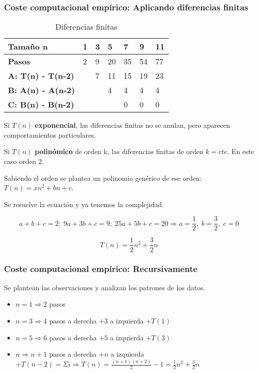 \subsubsection{Coste computacional empírico: Aplicando diferencias finitas}
\begin{table}[H]
    \begin{tabular}{|l|l|l|l|l|l|l|}
    \hline
    Tamaño n                  & \textbf{1} & \textbf{3} & \textbf{5} & \textbf{7} & \textbf{9} & \textbf{11} \\ \hline
    \textbf{Pasos}            & 2          & 9          & 20         & 35         & 54         & 77          \\ \hline
    \textbf{A: T(n) - T(n-2)} &            & 7          & 11         & 15         & 19         & 23          \\ \hline
    \textbf{B: A(n) - A(n-2)} &            &            & 4          & 4          & 4          & 4           \\ \hline
    \textbf{C: B(n) - B(n-2)} &            &            &            & 0          & 0          & 0           \\ \hline
    \end{tabular}
    \caption{Diferencias finitas}
\end{table}

Si $T(n)$ \textbf{exponencial}, las diferencias finitas no se anulan, pero aparecen comportamientos particulares.

Si $T(n)$ \textbf{polinómico} de orden k, las diferencias finitas de orden $k=cte$. En este caso orden 2.

Sabiendo el orden se plantea un polinomio genérico de ese orden: $T(n)=xn^2+bn+c$.

Se resuelve la ecuación y ya tenemos la complejidad.

$$a+b+c=2;\; 9a+3b+c=9;\; 25a+5b+c=20 \Rightarrow a=\frac{1}{2},\; b=\frac{3}{2},\; c=0$$

$$T(n)=\frac{1}{2}n^2+\frac{3}{2}n$$

\subsubsection{Coste computacional empírico: Recursivamente}
Se plantean las observaciones y analizan los patrones de los datos.

\begin{itemize}
    \item $n=1 \Rightarrow 2$ pasos
    \item $n=3 \Rightarrow 4$ pasos a derecha $+ 3$ a izquierda $+ T(1)$
    \item $n=5 \Rightarrow 6$ pasos a derecha $+ 5$ a izquierda $+ T(3)$
    \item $n \Rightarrow n+1$ pasos a derecha $+ n$ a izquierda $+ T(n-2) = \Sigma i \Rightarrow T(n)=\frac{(n+1)(n+2)}{2}-1=\frac{1}{2}n^2+\frac{3}{2}n$ 
\end{itemize}

